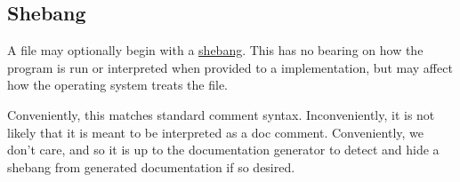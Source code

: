 \subsection{Shebang}

A \Trilogy{} file may optionally begin with a
\href{https://en.wikipedia.org/wiki/Shebang_(Unix)}{shebang}. This has no bearing
on how the program is run or interpreted when provided to a \Trilogy{} implementation,
but may affect how the operating system treats the file.

Conveniently, this matches standard comment syntax. Inconveniently, it is not
likely that it is meant to be interpreted as a doc comment. Conveniently,
we don't care, and so it is up to the documentation generator to detect and
hide a shebang from generated documentation if so desired.
